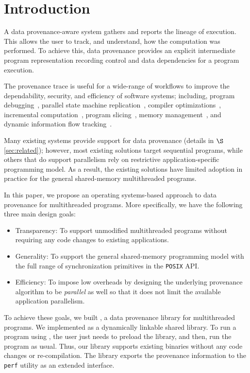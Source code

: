\section{Introduction}
\label{sec:introduction}

A data provenance-aware system gathers and reports the lineage of execution. This allows the user to track, and understand, how the computation was performed. To achieve this, 
data provenance provides an explicit intermediate program representation recording control and data dependencies for a program execution.  

The provenance trace is useful for a wide-range of workflows to improve the dependability, security, and efficiency of software systems; including, program debugging~\cite{fast-track-pldi}, parallel state machine replication~\cite{rex},  compiler optimizations~\cite{pgo}, incremental computation~\cite{ithreads}, program slicing~\cite{roly}, memory management~\cite{memprof}, and dynamic information flow tracking~\cite{dift}.

Many existing systems provide support for data provenance (details in $\S$\ref{sec:related}); however,
most existing solutions target sequential programs, while others that do support parallelism rely on restrictive application-specific programming model. As a result, the existing solutions have limited adoption in practice for the general shared-memory multithreaded programs.



In this paper, we propose an operating systems-based approach to data provenance for multithreaded programs. More specifically, we have the following three main design goals: 
\begin{itemize} 

\item Transparency: To support unmodified multithreaded programs without requiring any code changes to existing applications. 
\item Generality: To support the general shared-memory programming model with the  full range of synchronization primitives in the {\tt POSIX} API. 
\item Efficiency: To impose low overheads by designing the underlying provenance algorithm to be  {\em parallel} as well so that it does not limit the available application parallelism.

\end{itemize}

To achieve these goals, we built \projecttitle, a data provenance library for multithreaded programs. We implemented \projecttitle as a dynamically linkable shared library. To run a program using \projecttitle,  the user just needs to preload the \projecttitle library, and then, run the program as usual. Thus, our library supports existing binaries without any code changes or re-compilation. The library exports the provenance information to the {\tt perf} utility as an extended interface.

